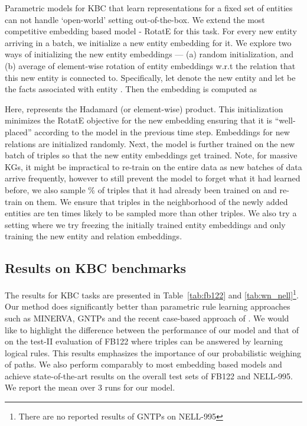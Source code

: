 \documentclass[11pt,a4paper]{article}
\newcommand{\fb}{FB122\xspace}
\newcommand{\nell}{NELL-995\xspace}
\begin{document}
Parametric models for KBC that learn representations for a fixed set of entities can not handle `open-world' setting out-of-the-box. We extend the most competitive embedding based model - RotatE \cite{sun2019rotate} for this task. For every new entity arriving in a batch, we initialize a new entity embedding for it. We explore two ways of initializing the new entity embeddings --- (a) random initialization, and (b) average of element-wise rotation of entity embeddings w.r.t the relation that this new entity is connected to. Specifically, let  denote the new entity and let  be the facts associated with entity . Then the embedding  is computed as

Here,  represents the Hadamard (or element-wise) product. This initialization minimizes the RotatE objective for the new embedding ensuring that it is ``well-placed'' according to the model in the previous time step. Embeddings for new relations are initialized randomly. Next, the model is further trained on the new batch of triples so that the new entity embeddings get trained.  Note, for massive KGs, it might be impractical to re-train on the entire data as new batches of data arrive frequently, however to still prevent the model to forget what it had learned before, we also sample \% of triples that it had already been trained on and re-train on them. We ensure that triples in the neighborhood of the newly added entities are ten times likely to be sampled more than other triples. We also try a setting where we try freezing the initially trained entity embeddings and only training the new entity and relation embeddings.


\subsection{Results on KBC benchmarks}
\label{sub:kbc}
The results for KBC tasks are presented in Table~\ref{tab:fb122} and \ref{tab:wn_nell}\footnote{There are no reported results of GNTPs on \nell}. Our method does significantly better than parametric rule learning approaches such as MINERVA, GNTPs and the recent case-based approach of \citet{cbr}. We would like to highlight the difference between the performance of our model and that of \citet{cbr} on the test-II evaluation of \fb where triples can be answered by learning logical rules. This results emphasizes the importance of our probabilistic weighing of paths. We also perform comparably to most embedding based models and achieve state-of-the-art results on the overall test sets of \fb and \nell. We report the mean over 3 runs for our model.
\end{document}
